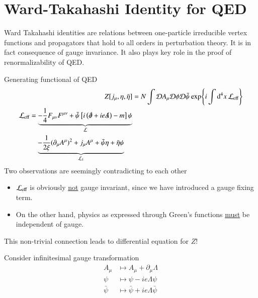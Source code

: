 
\section{Ward-Takahashi Identity for QED}
Ward Takahashi identities are relations between one-particle irreducible vertex functions and propagators that hold to all orders in perturbation theory. It is in fact consequence of gauge invariance. It also plays key role in the proof of renormalizability of QED.

Generating functional of QED
\begin{align}
   Z[j_\mu, \eta, \bar{\eta}] &= N \int \mathcal{D} A_\mu \mathcal{D} \phi \mathcal{D} \bar\psi \exp{i\int \dd[4]{x} \mathcal{L}_{\text{eff}}} \\
   \begin{split}
      \mathcal{L}_{\text{eff}} &= \underbrace{-\frac{1}{4} F_{\mu\nu}F^{\mu\nu} + \bar{\psi} \left[ i \left( \slashed{\partial} + ie \slashed{A} \right)  - m\right]\psi}_{\mathcal{L}} \\
                        &\quad  \underbrace{- \frac{1}{2\xi} (\partial_\mu A^\mu)^2 + j_\mu A^\mu + \bar\psi \eta + \bar\eta \psi}_{\mathcal{L}_1}
   \end{split}
\end{align}
Two observations are seemingly contradicting to each other
\begin{itemize}
   \item $\mathcal{L}_{\text{eff}}$ is obviously \underline{not} gauge invariant, since we have introduced a gauge fixing term.
   \item On the other hand, physics as expressed through Green's functions \underline{must} be independent of gauge.
\end{itemize}
This non-trivial connection leads to differential equation for $Z$!

Consider infinitesimal gauge transformation
\begin{align*}
   A_\mu &\mapsto A_\mu + \partial_\mu \Lambda \\
   \psi &\mapsto \psi - ie \Lambda \psi \\
   \bar\psi &\mapsto \bar\psi + ie \Lambda \bar\psi
\end{align*}


